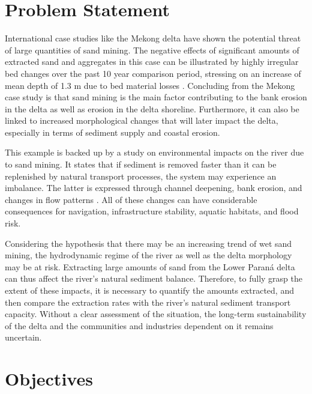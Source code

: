 \section{Problem Statement}

International case studies like the Mekong delta have shown the potential threat of large quantities of sand mining. The negative effects of significant amounts of extracted sand and aggregates in this case can be illustrated by highly irregular bed changes over the past 10 year comparison period, stressing on an increase of mean depth of 1.3 m due to bed material losses \autocite{brunierRecentMorphologicalChanges2014}. Concluding from the Mekong case study is that sand mining is the main factor contributing to the bank erosion in the delta as well as erosion in the delta shoreline. Furthermore, it can also be linked to increased morphological changes that will later impact the delta, especially in terms of sediment supply and coastal erosion.

This example is backed up by a study on environmental impacts on the river due to sand mining. It states that if sediment is removed faster than it can be replenished by natural transport processes, the system may experience an imbalance. The latter is expressed through channel deepening, bank erosion, and changes in flow patterns \autocite{rentierEnvironmentalImpactsRiver2022}. All of these changes can have considerable consequences for navigation, infrastructure stability, aquatic habitats, and flood risk. 

Considering the hypothesis that there may be an increasing trend of wet sand mining, the hydrodynamic regime of the river as well as the delta morphology may be at risk. Extracting large amounts of sand from the Lower Paraná delta can thus affect the river's natural sediment balance. Therefore, to fully grasp the extent of these impacts, it is necessary to quantify the amounts extracted, and then compare the extraction rates with the river’s natural sediment transport capacity. Without a clear assessment of the situation, the long-term sustainability of the delta and the communities and industries dependent on it remains uncertain.

\section{Objectives}


